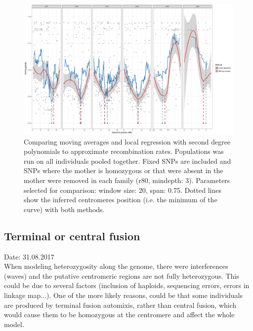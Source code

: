 \documentclass[10pt,a4paper]{report}
\begin{document}
\begin{figure}[h]
	\begin{center}
		\includegraphics[width=1.1\textwidth]{Num_CSD_loci/centro_group_fix_d3r80_final.pdf}
		\caption{Comparing moving averages and local regression with second degree polynomials to approximate recombination rates. Populations was run on all individuals pooled together. Fixed SNPs are included and SNPs where the mother is homozygous or that were absent in the mother were removed in each family (r80, mindepth: 3). Parameters selected for comparison: window size: 20, span: 0.75. Dotted lines show the inferred centromeres position (i.e. the minimum of the curve) with both methods.}
		\label{centro_fix}
	\end{center}
\end{figure}

\FloatBarrier

\subsection{Terminal or central fusion}

Date: 31.08.2017\\

When modeling heterozygosity along the genome, there were interferences (waves) and the putative centromeric regions are not fully heterozygous. This could be due to several factors (inclusion of 
haploids, sequencing errors, errors in linkage map...). One of the more likely reasons, could be that 
some individuals are produced by terminal fusion automixis, rather than central fusion, which would cause
them to be homozygous at the centromere and affect the whole model.\\
\end{document}
